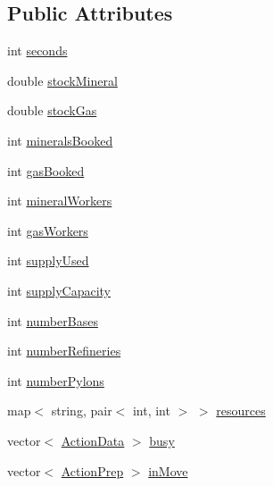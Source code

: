 \subsection*{Public Attributes}
\begin{DoxyCompactItemize}
\item 
int \hyperlink{structghost_1_1BuildOrderObjective_1_1State_a0aa600bbcf11f69da073ee5f5df45c86}{seconds}
\item 
double \hyperlink{structghost_1_1BuildOrderObjective_1_1State_a0e53b3e6a66bbd9ce0f9e08513796610}{stock\-Mineral}
\item 
double \hyperlink{structghost_1_1BuildOrderObjective_1_1State_af0fa35ae9792f888a68d588507de4d65}{stock\-Gas}
\item 
int \hyperlink{structghost_1_1BuildOrderObjective_1_1State_ade4e3c7a7f75aacebbb00997989477dd}{minerals\-Booked}
\item 
int \hyperlink{structghost_1_1BuildOrderObjective_1_1State_af4bb998060b50f33d32f20b0a576fb0f}{gas\-Booked}
\item 
int \hyperlink{structghost_1_1BuildOrderObjective_1_1State_aa4de47baa8f94de50faec04b91e365c3}{mineral\-Workers}
\item 
int \hyperlink{structghost_1_1BuildOrderObjective_1_1State_a17467d1d4d7d6a8f7ccfa96ae90a6bd8}{gas\-Workers}
\item 
int \hyperlink{structghost_1_1BuildOrderObjective_1_1State_a5eabdc60e3ea9d4063b6545741215fc1}{supply\-Used}
\item 
int \hyperlink{structghost_1_1BuildOrderObjective_1_1State_a2699219ad3dbb62ac5b5ec1fb12a8318}{supply\-Capacity}
\item 
int \hyperlink{structghost_1_1BuildOrderObjective_1_1State_a54d467ee421d3cdd60277fd2a813f46e}{number\-Bases}
\item 
int \hyperlink{structghost_1_1BuildOrderObjective_1_1State_aca273265810b45bd356a1c81f71c3a4b}{number\-Refineries}
\item 
int \hyperlink{structghost_1_1BuildOrderObjective_1_1State_a98217d636c0ee8ff7f2598c60add8c00}{number\-Pylons}
\item 
map$<$ string, pair$<$ int, int $>$ $>$ \hyperlink{structghost_1_1BuildOrderObjective_1_1State_a9fb998bd3bfb206ea64c06d466aece05}{resources}
\item 
vector$<$ \hyperlink{structghost_1_1ActionData}{Action\-Data} $>$ \hyperlink{structghost_1_1BuildOrderObjective_1_1State_a584c3367a42b491f5783adcd78d9b7d1}{busy}
\item 
vector$<$ \hyperlink{structghost_1_1BuildOrderObjective_1_1ActionPrep}{Action\-Prep} $>$ \hyperlink{structghost_1_1BuildOrderObjective_1_1State_a22879d00e86e8284fac0beb74cac32fe}{in\-Move}
\end{DoxyCompactItemize}


